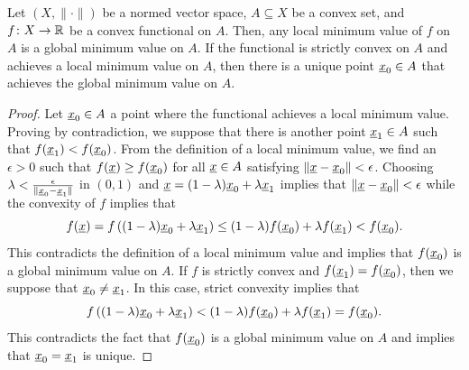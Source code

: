 \begin{theorem}
\label{theorem:convex_unique_min}
Let $(X,\|\cdot\|)$ be a normed vector space, $A \subseteq X$ be a convex set, and $f \colon X \rightarrow \mathbb{R}$ be a convex functional on $A$.
Then, any local minimum value of $f$ on $A$ is a global minimum value on $A$.
If the functional is strictly convex on $A$ and achieves a local minimum value on $A$, then there is a unique point $\underline{x}_0 \in A$ that achieves the global minimum value on $A$.
\end{theorem}
\begin{proof}
Let $\underline{x}_0 \in A$ a point where the functional achieves a local minimum value.
Proving by contradiction, we suppose that there is another point $\underline{x}_1 \in A$ such that $f(\underline{x}_1) <f(\underline{x}_0)$.
From the definition of a local minimum value, we find an $\epsilon > 0$ such that $f(\underline{x}) \geq f(\underline{x}_0)$ for all $\underline{x} \in A$ satisfying $\| \underline{x} - \underline{x}_0 \| < \epsilon$.
Choosing $\lambda < \frac{\epsilon}{\smash{\| \underline{x}_0 - \underline{x}_1 \|}}$ in $(0,1)$ and $\underline{x} = (1-\lambda) \underline{x}_0 + \lambda \underline{x}_1$ implies that $\| \underline{x} - \underline{x}_0 \| < \epsilon $
while the convexity of $f$ implies that
\[ f( \underline{x} ) = f \left( (1-\lambda) \underline{x}_0 + \lambda \underline{x}_1 \right) \leq (1-\lambda) f(\underline{x}_0) + \lambda f(\underline{x}_1) < f(\underline{x}_0). \]
This contradicts the definition of a local minimum value and implies that $f(\underline{x}_0)$ is a global minimum value on $A$.
If $f$ is strictly convex and $f(\underline{x}_1) = f(\underline{x}_0)$, then we suppose that $\underline{x}_0 \neq \underline{x}_1$.
In this case, strict convexity implies that
\[ f \left( (1-\lambda) \underline{x}_0 + \lambda \underline{x}_1 \right) < (1-\lambda) f(\underline{x}_0) + \lambda f(\underline{x}_1) = f(\underline{x}_0). \]
This contradicts the fact that $f(\underline{x}_0)$ is a global minimum value on $A$ and implies that $\underline{x}_0 = \underline{x}_1$ is unique.
\end{proof}


